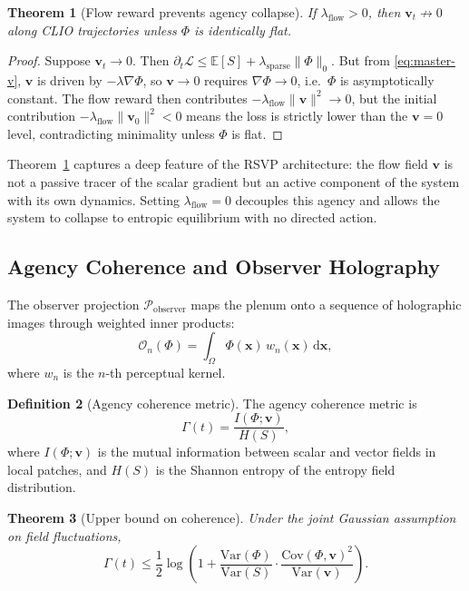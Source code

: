 \documentclass[12pt, a4paper]{article}
\theoremstyle{plain}
\newtheorem{theorem}{Theorem}[section]
\theoremstyle{definition}
\newtheorem{definition}[theorem]{Definition}
\theoremstyle{remark}
\newcommand{\vfield}{\mathbf{v}}
\newcommand{\Proj}[1]{\mathcal{P}_{#1}}
\begin{document}
\begin{theorem}[Flow reward prevents agency collapse]
\label{thm:agency}
If $\lambda_{\mathrm{flow}} > 0$, then $\vfield_t \not\to 0$ along CLIO trajectories
unless $\Phi$ is identically flat.
\end{theorem}

\begin{proof}
Suppose $\vfield_t \to 0$.  Then $\partial_t\mathcal{L} \leq \mathbb{E}[S] + \lambda_{\mathrm{sparse}}\|\Phi\|_0$.
But from \eqref{eq:master-v}, $\vfield$ is driven by $-\lambda\nabla\Phi$, so $\vfield\to 0$
requires $\nabla\Phi\to 0$, i.e.\ $\Phi$ is asymptotically constant.  The flow reward
then contributes $-\lambda_{\mathrm{flow}}\|\vfield\|^2 \to 0$, but the initial contribution
$-\lambda_{\mathrm{flow}}\|\vfield_0\|^2 < 0$ means the loss is strictly lower than the
$\vfield = 0$ level, contradicting minimality unless $\Phi$ is flat.
\end{proof}

Theorem~\ref{thm:agency} captures a deep feature of the RSVP architecture: the flow field
$\vfield$ is not a passive tracer of the scalar gradient but an active component of the
system with its own dynamics.  Setting $\lambda_{\mathrm{flow}} = 0$ decouples this
agency and allows the system to collapse to entropic equilibrium with no directed action.

\subsection{Agency Coherence and Observer Holography}

The observer projection $\Proj{\mathrm{observer}}$ maps the plenum onto a sequence of
holographic images through weighted inner products:
\[
\mathcal{O}_n(\Phi) = \int_\Omega \Phi(\mathbf{x})\,w_n(\mathbf{x})\,\mathrm{d}\mathbf{x},
\]
where $w_n$ is the $n$-th perceptual kernel.

\begin{definition}[Agency coherence metric]
The agency coherence metric is
\[
\Gamma(t) = \frac{I(\Phi;\vfield)}{H(S)},
\]
where $I(\Phi;\vfield)$ is the mutual information between scalar and vector fields in
local patches, and $H(S)$ is the Shannon entropy of the entropy field distribution.
\end{definition}

\begin{theorem}[Upper bound on coherence]
Under the joint Gaussian assumption on field fluctuations,
\[
\Gamma(t) \leq \frac{1}{2}\log\!\left(1 + \frac{\mathrm{Var}(\Phi)}{\mathrm{Var}(S)}\cdot
\frac{\mathrm{Cov}(\Phi,\vfield)^2}{\mathrm{Var}(\vfield)}\right).
\]
\end{theorem}
\end{document}
